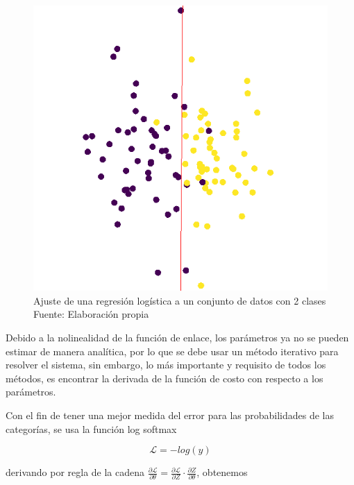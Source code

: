         \begin{figure}[H]
            \centering
            \includegraphics[scale=0.5]{imagenes/logistic_reg}
            \caption{Ajuste de una regresión logística a un conjunto de datos con 2 clases\\ Fuente: Elaboración propia}
        \end{figure}
        Debido a la nolinealidad de la función de enlace, los parámetros ya no se pueden estimar de manera analítica, por lo que se debe usar un método iterativo para resolver el sistema, sin embargo, lo más importante y requisito de todos los métodos, es encontrar la derivada de la función de costo con respecto a los parámetros.
        
        Con el fin de tener una mejor medida del error para las probabilidades de las categorías, se usa la función log softmax
        
        \begin{equation}
            \mathcal{L} = -log(\hat{y})
        \end{equation}
        
        \noindent derivando por regla de la cadena $\frac{\partial\mathcal{L}}{\partial \theta} = \frac{\partial\mathcal{L}}{\partial Z} \cdot \frac{\partial Z}{\partial \theta}$, obtenemos
        
